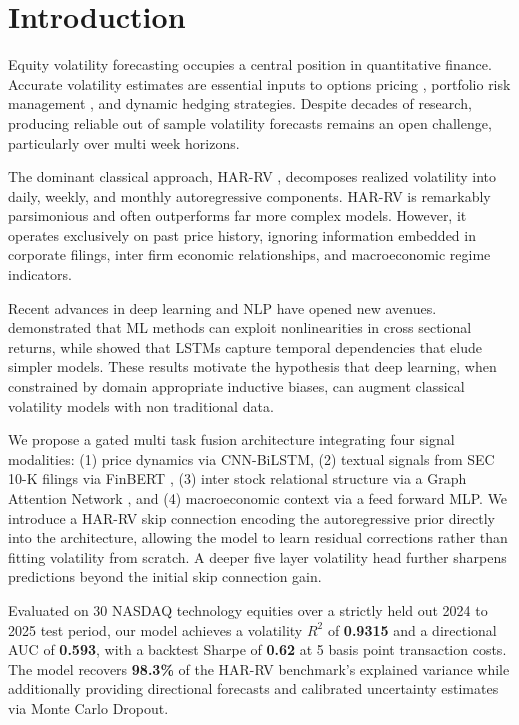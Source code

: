 \documentclass[10pt, twocolumn, a4paper]{article}
\begin{document}
\section{Introduction}
\label{sec:intro}

Equity volatility forecasting occupies a central position in quantitative
finance. Accurate volatility estimates are essential inputs to options
pricing \citep{black1973pricing}, portfolio risk management
\citep{markowitz1952portfolio}, and dynamic hedging strategies. Despite
decades of research, producing reliable out of sample volatility forecasts
remains an open challenge, particularly over multi week horizons.

The dominant classical approach, HAR{-}RV \citep{corsi2009simple}, decomposes
realized volatility into daily, weekly, and monthly autoregressive components.
HAR{-}RV is remarkably parsimonious and often outperforms far more complex
models. However, it operates exclusively on past price history, ignoring
information embedded in corporate filings, inter firm economic relationships,
and macroeconomic regime indicators.

Recent advances in deep learning and NLP have opened new avenues.
\citet{gu2020empirical} demonstrated that ML methods can exploit
nonlinearities in cross sectional returns, while \citet{fischer2018deep}
showed that LSTMs capture temporal dependencies that elude simpler models.
These results motivate the hypothesis that deep learning, when constrained
by domain appropriate inductive biases, can augment classical volatility
models with non traditional data.

We propose a gated multi task fusion architecture integrating four signal
modalities: (1) price dynamics via CNN{-}BiLSTM, (2) textual signals from
SEC 10{-}K filings via FinBERT \citep{yang2020finbert}, (3) inter stock
relational structure via a Graph Attention Network \citep{velivckovic2018graph},
and (4) macroeconomic context via a feed forward MLP. We introduce a HAR{-}RV
skip connection encoding the autoregressive prior directly into the
architecture, allowing the model to learn residual corrections rather than
fitting volatility from scratch. A deeper five layer volatility head
further sharpens predictions beyond the initial skip connection gain.

Evaluated on 30 NASDAQ technology equities over a strictly held out
2024 to 2025 test period, our model achieves a volatility $R^2$ of
\textbf{0.9315} and a directional AUC of \textbf{0.593}, with a
backtest Sharpe of \textbf{0.62} at 5 basis point transaction costs.
The model recovers \textbf{98.3\%} of the HAR{-}RV benchmark's
explained variance while additionally providing directional forecasts
and calibrated uncertainty estimates via Monte Carlo Dropout.
\end{document}
